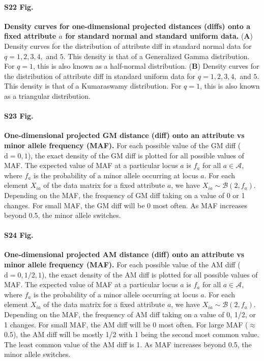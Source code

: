 \documentclass[10pt,letterpaper]{article}
\begin{document}
\paragraph*{S22 Fig.}
\label{S22_Fig}
{\bf Density curves for one-dimensional projected distances (diffs) onto a fixed attribute $a$ for standard normal and standard uniform data.} (\textbf{A}) Density curves for the distribution of attribute diff in standard normal data for $q=1,2,3,4,$ and $5$. This density is that of a Generalized Gamma distribution. For $q=1$, this is also known as a half-normal distribution. (\textbf{B}) Density curves for the distribution of attribute diff in standard uniform data for $q=1,2,3,4,$ and $5$. This density is that of a Kumaraswamy distribution. For $q=1$, this is also known as a triangular distribution.

\paragraph*{S23 Fig.}
\label{S23_Fig}
{\bf One-dimensional projected GM distance (diff) onto an attribute vs minor allele frequency (MAF).} For each possible value of the GM diff ($\text{d} = 0,1$), the exact density of the GM diff is plotted for all possible values of MAF. The expected value of MAF at a particular locus $a$ is $f_a$ for all $a \in \mathcal{A}$, where $f_a$ is the probability of a minor allele occurring at locus $a$. For each element $X_{ia}$ of the data matrix for a fixed attribute $a$, we have $X_{ia} \sim \mathcal{B}(2,f_a)$. Depending on the MAF, the frequency of GM diff taking on a value of 0 or 1 changes. For small MAF, the GM diff will be 0 most often. As MAF increases beyond 0.5, the minor allele switches.

\paragraph*{S24 Fig.}
\label{S24_Fig}
{\bf One-dimensional projected AM distance (diff) onto an attribute vs minor allele frequency (MAF).} For each possible value of the AM diff ($\text{d} = 0,1/2,1$), the exact density of the AM diff is plotted for all possible values of MAF. The expected value of MAF at a particular locus $a$ is $f_a$ for all $a \in \mathcal{A}$, where $f_a$ is the probability of a minor allele occurring at locus $a$. For each element $X_{ia}$ of the data matrix for a fixed attribute $a$, we have $X_{ia} \sim \mathcal{B}(2,f_a)$. Depending on the MAF, the frequency of AM diff taking on a value of 0, 1/2, or 1 changes. For small MAF, the AM diff will be 0 most often. For large MAF ($\approx$0.5), the AM diff will be mostly 1/2 with 1 being the second most common value. The least common value of the AM diff is 1. As MAF increases beyond 0.5, the minor allele switches.
\end{document}
